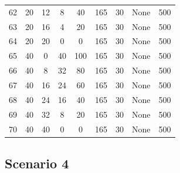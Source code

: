 \documentclass[
]{article}
\begin{document}
\begin{table}[H]
\begin{tabular}{ccccccccc}
62 & 20 & 12 & 8 & 40 & 165 & 30 & None & 500\\
\rowcolor{gray!6}  63 & 20 & 16 & 4 & 20 & 165 & 30 & None & 500\\
64 & 20 & 20 & 0 & 0 & 165 & 30 & None & 500\\
\rowcolor{gray!6}  65 & 40 & 0 & 40 & 100 & 165 & 30 & None & 500\\
66 & 40 & 8 & 32 & 80 & 165 & 30 & None & 500\\
\rowcolor{gray!6}  67 & 40 & 16 & 24 & 60 & 165 & 30 & None & 500\\
68 & 40 & 24 & 16 & 40 & 165 & 30 & None & 500\\
\rowcolor{gray!6}  69 & 40 & 32 & 8 & 20 & 165 & 30 & None & 500\\
70 & 40 & 40 & 0 & 0 & 165 & 30 & None & 500\\
\bottomrule
\end{tabular}
\end{table}
\pagebreak

\subsection{Scenario 4}
\end{document}
